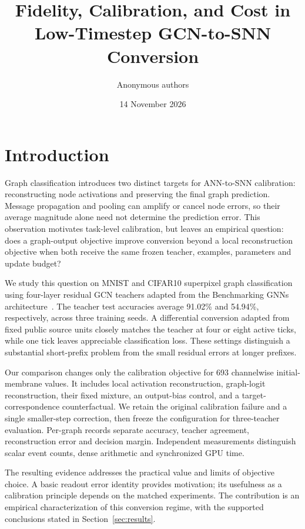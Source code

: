\documentclass[10pt,twocolumn]{article}
\title{Fidelity, Calibration, and Cost in Low-Timestep GCN-to-SNN Conversion}
\author{Anonymous authors}
\date{14 November 2026}
\begin{document}
\maketitle
\begin{abstract}

\end{abstract}

\section{Introduction}
Graph classification introduces two distinct targets for ANN-to-SNN calibration: reconstructing node activations and preserving the final graph prediction. Message propagation and pooling can amplify or cancel node errors, so their average magnitude alone need not determine the prediction error. This observation motivates task-level calibration, but leaves an empirical question: does a graph-output objective improve conversion beyond a local reconstruction objective when both receive the same frozen teacher, examples, parameters and update budget?

We study this question on MNIST and CIFAR10 superpixel graph classification using four-layer residual GCN teachers adapted from the Benchmarking GNNs architecture~\citep{dwivedi2023}. The teacher test accuracies average 91.02\% and 54.94\%, respectively, across three training seeds. A differential conversion adapted from fixed public source units closely matches the teacher at four or eight active ticks, while one tick leaves appreciable classification loss. These settings distinguish a substantial short-prefix problem from the small residual errors at longer prefixes.

Our comparison changes only the calibration objective for 693 channelwise initial-membrane values. It includes local activation reconstruction, graph-logit reconstruction, their fixed mixture, an output-bias control, and a target-correspondence counterfactual. We retain the original calibration failure and a single smaller-step correction, then freeze the configuration for three-teacher evaluation. Per-graph records separate accuracy, teacher agreement, reconstruction error and decision margin. Independent measurements distinguish scalar event counts, dense arithmetic and synchronized GPU time.

The resulting evidence addresses the practical value and limits of objective choice. A basic readout error identity provides motivation; its usefulness as a calibration principle depends on the matched experiments. The contribution is an empirical characterization of this conversion regime, with the supported conclusions stated in Section~\ref{sec:results}.
\end{document}
